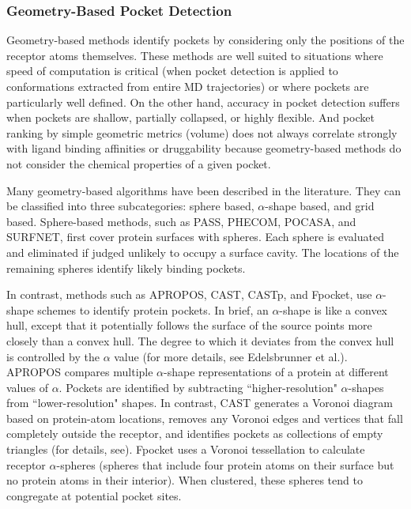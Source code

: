 \subsubsection{Geometry-Based Pocket Detection}
\par Geometry-based methods identify pockets by considering only the positions of the receptor atoms themselves. These methods are well suited to situations where speed of computation is critical (\eg when pocket detection is applied to conformations extracted from entire MD trajectories) or where pockets are particularly well defined. On the other hand, accuracy in pocket detection suffers when pockets are shallow, partially collapsed, or highly flexible. And pocket ranking by simple geometric metrics (\eg volume) does not always correlate strongly with ligand binding affinities or druggability because geometry-based methods do not consider the chemical properties of a given pocket.\cite{Durrant2011,Chovancova2012a,Eyrisch2007b,Brady2000a,LeGuilloux2009a,Schmidtke2011b,Halgren2007a,Halgren2009a,Brenke2009a,Votapka2013,Zheng2013a}
\par Many geometry-based algorithms have been described in the literature. They can be classified into three subcategories: sphere based, $\alpha$-shape based,\cite{Edelsbrunner1994a} and grid based. Sphere-based methods, such as PASS,\cite{Brady2000a} PHECOM,\cite{Kawabata2007a} POCASA,\cite{Yu2010a} and SURFNET,\cite{Laskowski1995a} first cover protein surfaces with spheres. Each sphere is evaluated and eliminated if judged unlikely to occupy a surface cavity. The locations of the remaining spheres identify likely binding pockets.
\par In contrast, methods such as  APROPOS,\cite{Peters1996a} CAST,\cite{Liang1998a} CASTp,\cite{Binkowski2003a} and Fpocket,\cite{LeGuilloux2009a} use $\alpha$-shape schemes to identify protein pockets. In brief, an $\alpha$-shape is like a convex hull, except that it potentially follows the surface of the source points more closely than a convex hull. The degree to which it deviates from the convex hull is controlled by the $\alpha$ value (for more details, see Edelsbrunner et al.\cite{Edelsbrunner1983a}). APROPOS compares multiple $\alpha$-shape representations of a protein at different values of $\alpha$.\cite{Peters1996a} Pockets are identified by subtracting ``higher-resolution" $\alpha$-shapes from ``lower-resolution" shapes. In contrast, CAST generates a Voronoi diagram based on protein-atom locations, removes any Voronoi edges and vertices that fall completely outside the receptor, and identifies pockets as collections of empty triangles (for details, see\cite{Liang1998a}). Fpocket uses a Voronoi tessellation to calculate receptor $\alpha$-spheres (\ie spheres that include four protein atoms on their surface but no protein atoms in their interior).\cite{LeGuilloux2009a} When clustered, these spheres tend to congregate at potential pocket sites.

